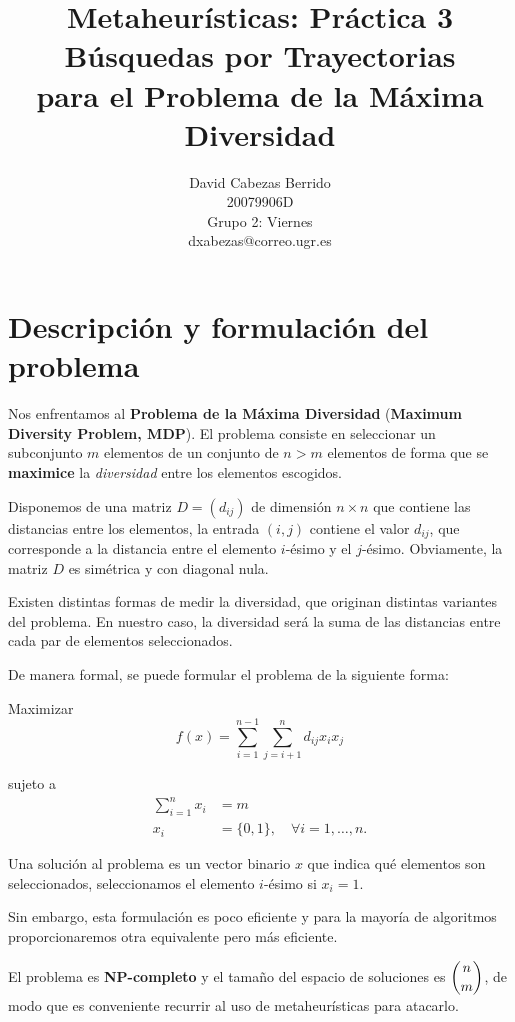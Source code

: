 \documentclass{article}
\title{\Huge Metaheurísticas: Práctica 3 \\ Búsquedas por Trayectorias \\ para el Problema de la Máxima Diversidad \vspace{10mm}}
\author{\huge David Cabezas Berrido \vspace{10mm} \\
	\huge 20079906D \vspace{10mm} \\  
  \huge Grupo 2: Viernes \vspace{10mm} \\ 
  \huge dxabezas@correo.ugr.es \vspace{10mm}}
\begin{document}
\maketitle
\newpage
\tableofcontents
\newpage

\section{Descripción y formulación del problema}

Nos enfrentamos al \textbf{Problema de la Máxima Diversidad} (\textbf{Maximum Diversity Problem, MDP}). El problema consiste en seleccionar
un subconjunto $m$ elementos de un conjunto de $n>m$ elementos de forma que se \textbf{maximice} la \emph{diversidad} entre los
 elementos escogidos.
 
 Disponemos de una matriz $D=(d_{ij})$ de dimensión $n\times n$ que contiene las distancias entre los elementos, la entrada $(i,j)$ contiene el
 valor $d_{ij}$, que corresponde a la distancia entre el elemento $i$-ésimo y el $j$-ésimo. Obviamente, la matriz $D$ es simétrica y con
 diagonal nula.
 
 Existen distintas formas de medir la diversidad, que originan distintas variantes del problema. En nuestro caso, la diversidad será la suma
 de las distancias entre cada par de elementos seleccionados.

De manera formal, se puede formular el problema de la siguiente forma:

\begin{description}
	\item Maximizar 
	\begin{equation} \label{eq:objetivo}
		f(x)=\sum_{i=1}^{n-1}\sum_{j=i+1}^n d_{ij} x_i x_j
	\end{equation}
	\item sujeto a 
	\begin{align*}
		\sum_{i=1}^n x_i &= m \\
		x_i&= \{0,1\}, \quad\forall i=1,\ldots, n.
	\end{align*}
\end{description}

Una solución al problema es un vector binario $x$ que indica qué elementos son seleccionados, seleccionamos el elemento $i$-ésimo si $x_i=1$.

Sin embargo, esta formulación es poco eficiente y para la mayoría de algoritmos proporcionaremos otra equivalente pero más eficiente.

El problema es \textbf{NP-completo} y el tamaño del espacio de soluciones es $\dbinom{n}{m}$, de modo que es conveniente recurrir al uso de metaheurísticas
para atacarlo.
\end{document}
